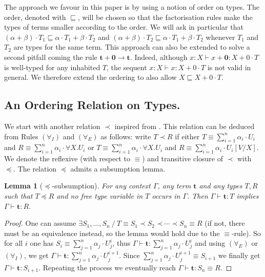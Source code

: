 \documentclass[colorlinks=true,linkcolor=black,urlcolor=black,citecolor=blue,submission,copyright,creativecommons]{eptcs}
\newtheorem{lemma}[theorem]{Lemma}
\newcommand{\ve}[1]{\mathrm{\textbf{#1}}}
\newcommand{\type}{\colon\!}
\newcommand{\sui}[1]{\sum_{i=1}^{#1}}
\newcommand{\suj}[1]{\sum_{j=1}^{#1}}
\begin{document}
The approach we favour in this paper is by using a notion of order on
types. The order, denoted with $\sqsubseteq$, will be chosen so that
the factorisation rules make the
types of terms smaller according to the order. We will ask in
particular that $(\alpha+\beta)\cdot T_1\sqsubseteq\alpha\cdot
T_1+\beta\cdot T_2$ and $(\alpha+\beta)\cdot T_2\sqsubseteq\alpha\cdot
T_1+\beta\cdot T_2$ whenever $T_1$ and $T_2$ are types for the same
term. 
This approach can also be extended to solve a second pitfall coming the
rule ${\ve t} + \ve0 \to \ve t$. Indeed, although $x:X\vdash x + \ve0
: X+0\cdot T$ is well-typed for any inhabited $T$, the sequent
$x:X\vdash x:X+0\cdot T$ is not valid in general. We therefore extend
the ordering to also allow $X\sqsubseteq X+0\cdot T$.


\subsection{An Ordering Relation on Types.}

We start with another relation $\prec$ inspired from
\cite{Barendregt92}. This relation can be deduced from Rules
$(\forall_I)$ and $(\forall_E)$ as follows: write $T\prec R$ if either
$T\equiv\sui{n}\alpha_i\cdot U_i$ and $R\equiv\sui{n}\alpha_i\cdot
\forall X.U_i$ or $T\equiv\sui{n}\alpha_i\cdot \forall X.U_i$ and
$R\equiv \sui{n}\alpha_i\cdot U_i[V/X]$. We denote the reflexive
(with respect to $\equiv$) and transitive closure of $\prec$ with $\preceq$.
The relation $\preceq$ admits a subsumption lemma.

\begin{lemma}[$\preceq$-subsumption]\label{lem:subsumption}
  For any context $\Gamma$, any term $\ve t$ and any types $T, R$ such that $T\preceq R$ and no free type variable in $T$ occurs in $\Gamma$. Then 
  $\Gamma\vdash\ve{t}\type T$ implies $\Gamma\vdash\ve{t}\type R$.
\end{lemma}
\begin{proof}
 One can assume $\exists S_1,\dots,S_n~/~T\equiv S_1 \prec S_2 \prec
 \cdots \prec S_n \equiv R$ (if not, there must be an equivalence
 instead, so the lemma would hold due to the $\equiv$-rule). So
 for all $i$ one has $S_i\equiv\suj{n}\alpha_j{\cdot} U^i_j$, thus
 $\Gamma\vdash\ve{t}\type \suj{n}\alpha_j{\cdot} U^i_j$ and using
 $(\forall_E)$ or $(\forall_I)$, we get $\Gamma\vdash\ve{t}\type
 \suj{n}\alpha_j{\cdot} U^{i+1}_j$. Since $\suj{n}\alpha_j{\cdot}
 U^{i+1}_j\equiv S_{i+1}$ we finally get $\Gamma\vdash\ve{t}\type
 S_{i+1}$. Repeating the process we eventually reach $\Gamma\vdash\ve{t}\type S_{n}\equiv R$.
\end{proof}
\end{document}
